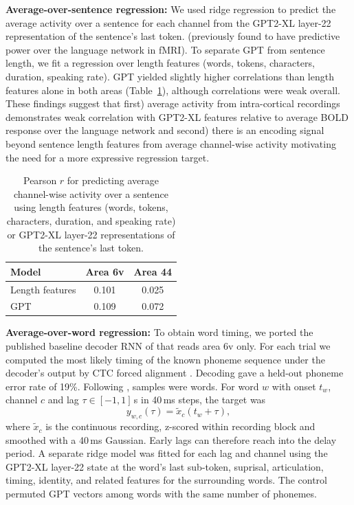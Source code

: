 \documentclass[11pt]{article}
\begin{document}
\textbf{Average-over-sentence regression:} We used ridge regression to predict the average activity over a sentence for each channel from the GPT2-XL layer-22 representation of the sentence's last token. \cite{radford2019language} (previously found to have predictive power over the language network in fMRI). To separate GPT from sentence length, we fit a regression over length features (words, tokens, characters, duration, speaking rate). GPT yielded slightly higher correlations than length features alone in both areas (Table~\ref{tab:sentence}), although correlations were weak overall. These findings suggest that first) average activity from intra-cortical recordings demonstrates weak correlation with GPT2-XL features relative to average BOLD response over the language network and second) there is an encoding signal beyond sentence length features from average channel-wise activity motivating the need for a more expressive regression target.

\begin{table}[h]
\centering
\begin{tabular}{lcc}
\toprule
Model & Area 6v & Area 44 \\
\midrule
Length features & 0.101 & 0.025 \\
GPT & 0.109 & 0.072 \\
\bottomrule
\end{tabular}
\caption{Pearson $r$ for predicting average channel-wise activity over a sentence using length features (words, tokens, characters, duration, and speaking rate) or GPT2-XL layer-22 representations of the sentence's last token.}
\label{tab:sentence}
\end{table}

\textbf{Average-over-word regression:} To obtain word timing, we ported the published baseline decoder RNN of \citet{willett2023speech} that reads area 6v only. For each trial we computed the most likely timing of the known phoneme sequence under the decoder's output by CTC forced alignment \cite{graves2006connectionist}. Decoding gave a held-out phoneme error rate of 19\%. Following \citet{goldstein2022shared}, samples were words. For word $w$ with onset $t_w$, channel $c$ and lag $\tau \in [-1, 1]$\,s in 40\,ms steps, the target was
\begin{equation}
y_{w,c}(\tau) = \tilde{x}_c(t_w + \tau),
\end{equation}
where $\tilde{x}_c$ is the continuous recording, z-scored within recording block and smoothed with a 40\,ms Gaussian. Early lags can therefore reach into the delay period. A separate ridge model was fitted for each lag and channel using the GPT2-XL layer-22 state at the word's last sub-token, suprisal, articulation, timing, identity, and related features for the surrounding words. The control permuted GPT vectors among words with the same number of phonemes. 
\end{document}
